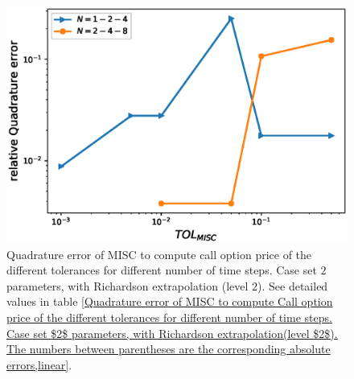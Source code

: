 \begin{figure}[h!]
	\centering
	\includegraphics[width=0.4\linewidth]{./figures/rBergomi_MISC_quadratre_error/vs_TOL/set2/relative_quad_error_wrt_MISC_TOL_set2_rich_level2_linear}
	
	
	\caption{Quadrature error of MISC to compute call option price of the different tolerances for different number of time steps. Case  set $2$ parameters, with Richardson extrapolation (level $2$).  See detailed values  in table \ref{Quadrature error of MISC to compute Call option price of the different tolerances for different number of time steps. Case set $2$ parameters, with Richardson extrapolation(level $2$). The numbers between parentheses are the corresponding absolute errors,linear}.}
	\label{fig:Quadrature_error_set2_rich_linear}
\end{figure}


